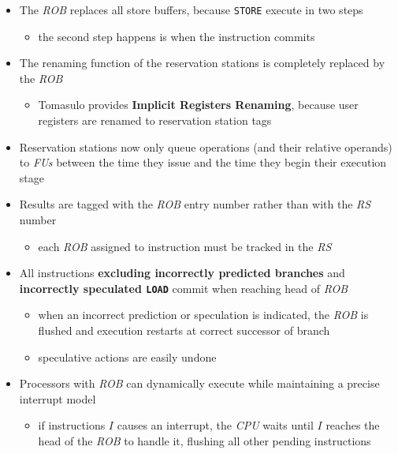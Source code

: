 \documentclass[english]{article}
\begin{document}
\begin{itemize}
  \item The \textit{ROB} replaces all store buffers, because \texttt{STORE} execute in two steps
        \begin{itemize}
          \item the second step happens is when the instruction commits
        \end{itemize}
  \item The renaming function of the reservation stations is completely replaced by the \textit{ROB}
        \begin{itemize}
          \item Tomasulo provides \textbf{Implicit Registers Renaming}, because user registers are renamed to reservation station tags
        \end{itemize}
  \item Reservation stations now only queue operations (and their relative operands) to \textit{FUs} between the time they issue and the time they begin their execution stage
  \item Results are tagged with the \textit{ROB} entry number rather than with the \textit{RS} number
        \begin{itemize}
          \item each \textit{ROB} assigned to instruction must be tracked in the \textit{RS}
        \end{itemize}
  \item All instructions \textbf{excluding incorrectly predicted branches} and \textbf{incorrectly speculated \texttt{LOAD}} commit when reaching head of \textit{ROB}
        \begin{itemize}
          \item when an incorrect prediction or speculation is indicated, the \textit{ROB} is flushed and execution restarts at correct successor of branch
          \item speculative actions are easily undone
        \end{itemize}
  \item Processors with \textit{ROB} can dynamically execute while maintaining a precise interrupt model
        \begin{itemize}
          \item if instructions \(I\) causes an interrupt, the \textit{CPU} waits until \(I\) reaches the head of the \textit{ROB} to handle it, flushing all other pending instructions
        \end{itemize}
\end{itemize}
\end{document}
